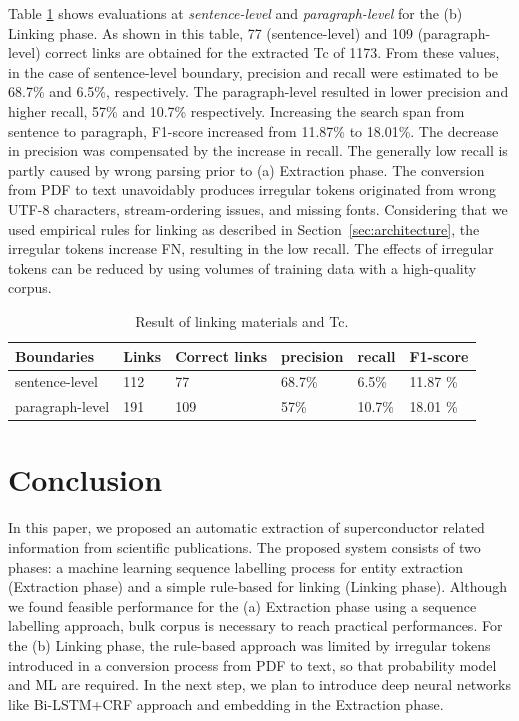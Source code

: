 \documentclass{article}[a4]
\begin{document}
Table \ref{table:result-linking} shows evaluations at \textit{sentence-level} and \textit{paragraph-level} for the (b) Linking phase. As shown in this table, 77 (sentence-level) and 109 (paragraph-level) correct links are obtained for the extracted Tc of 1173. From these values, in the case of sentence-level boundary, precision and recall were estimated to be 68.7\% and 6.5\%, respectively. The paragraph-level resulted in lower precision and higher recall, 57\% and 10.7\% respectively. Increasing the search span from sentence to paragraph, F1-score increased from 11.87\% to 18.01\%. The decrease in precision was compensated by the increase in recall.
The generally low recall is partly caused by wrong parsing prior to (a) Extraction phase. The conversion from PDF to text unavoidably produces irregular tokens originated from wrong UTF-8 characters, stream-ordering issues, and missing fonts. Considering that we used empirical rules for linking as described in Section~\ref{sec:architecture}, the irregular tokens increase FN, resulting in the low recall. The effects of irregular tokens can be reduced by using volumes of training data with a high-quality corpus.

\begin{table}[h!]
    \centering
    \caption{Result of linking materials and Tc.}   
    \begin{tabular}{ | m{7em} | m{4em}| m{4em}| m{4em}| m{4em} | m{4em} | } 
    \hline
        Boundaries & Links & Correct links & precision & recall & F1-score \\
    \hline
            sentence-level  & 112 & 77 & 68.7\% & 6.5\% & 11.87 \% \\
    \hline
            paragraph-level & 191 & 109 & 57\% & 10.7\% & 18.01 \% \\
    \hline
    \end{tabular}
    \label{table:result-linking}
\end{table}

\section{Conclusion}
\label{sec:conclusion}
In this paper, we proposed an automatic extraction of superconductor related information from scientific publications. The proposed system consists of two phases: a machine learning sequence labelling process for entity extraction (Extraction phase) and a simple rule-based for linking (Linking phase).
Although we found feasible performance for the (a) Extraction phase using a sequence labelling approach, bulk corpus is necessary to reach practical performances. For the (b) Linking phase, the rule-based approach was limited by irregular tokens introduced in a conversion process from PDF to text, so that probability model and ML are required. In the next step, we plan to introduce deep neural networks like Bi-LSTM+CRF approach and embedding in the Extraction phase.

\pagebreak



\end{document}
